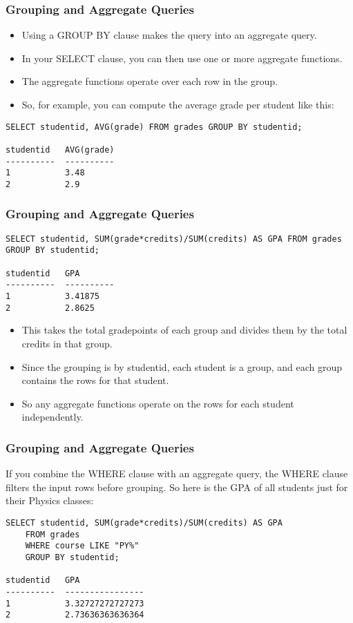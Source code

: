 \begin{frame}[fragile] \frametitle{Grouping and Aggregate Queries}
\begin{itemize}
\item Using a GROUP BY clause makes the query into an aggregate query. 
\item In your SELECT clause, you can then use one or more aggregate functions. 
\item The aggregate functions operate over each row in the group. 
\item So, for example, you can compute the average grade per student like this:
\end{itemize}
\begin{lstlisting}
SELECT studentid, AVG(grade) FROM grades GROUP BY studentid;

studentid   AVG(grade)
----------  ----------
1           3.48      
2           2.9       
\end{lstlisting}
\end{frame}

\begin{frame}[fragile] \frametitle{Grouping and Aggregate Queries}
\begin{lstlisting}
SELECT studentid, SUM(grade*credits)/SUM(credits) AS GPA FROM grades GROUP BY studentid;

studentid   GPA       
----------  ----------
1           3.41875   
2           2.8625      
\end{lstlisting}
\begin{itemize}
\item This takes the total gradepoints of each group and divides them by the total credits in that group.
\item Since the grouping is by studentid, each student is a group, and each group contains the rows for that student. 
\item So any aggregate functions operate on the rows for each student independently.
\end{itemize}
\end{frame}

\begin{frame}[fragile] \frametitle{Grouping and Aggregate Queries}
If you combine the WHERE clause with an aggregate query, the WHERE clause filters the input rows before grouping. So here is the GPA of all students just for their Physics classes:
\begin{lstlisting}
SELECT studentid, SUM(grade*credits)/SUM(credits) AS GPA
    FROM grades
    WHERE course LIKE "PY%"
    GROUP BY studentid;

studentid   GPA             
----------  ----------------
1           3.32727272727273
2           2.73636363636364  
\end{lstlisting}
\end{frame}

